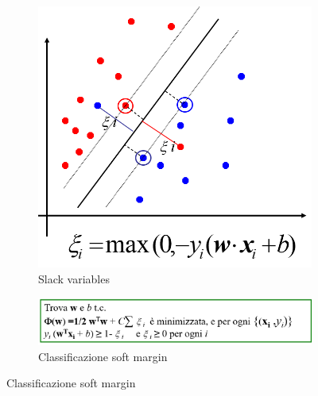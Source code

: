 \documentclass[a4paper,oneside,titlepage]{book}
\begin{document}
\begin{figure}[htp]
	\begin{subfigure}{0.49\textwidth}
	    \centering
		\includegraphics[width=\textwidth, height=\textheight, keepaspectratio]{svm-lin6.png}
		\caption{Slack variables}
	\end{subfigure}
	\hfill
	\begin{subfigure}{0.49\textwidth}
	    \centering
		\includegraphics[width=\textwidth, height=\textheight, keepaspectratio]{svm-lin7.png}
		\caption{Classificazione soft margin}
	\end{subfigure}
\end{figure}
\end{document}
